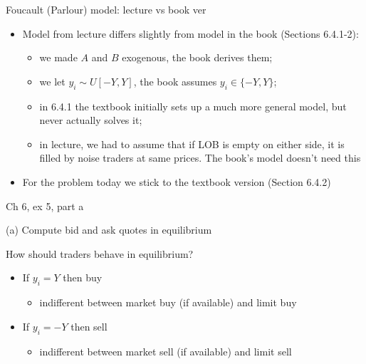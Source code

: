 \documentclass[english,10pt
,aspectratio=169
]{beamer}
\begin{document}
\begin{frame}{Foucault (Parlour) model: lecture vs book ver}
	\begin{itemize}
		\item Model from lecture differs slightly from model \alert{in the book} (Sections 6.4.1-2):
		\begin{itemize}
			\item we made $A$ and $B$ exogenous, the book derives them;
			\item we let $y_i \sim U[-Y,Y]$, the book assumes $y_i \in \{-Y,Y\}$;
			\item in 6.4.1 the textbook initially sets up a much more general model, but never actually solves it;
			\item in lecture, we had to assume that if LOB is empty on either side, it is filled by noise traders at same prices. The book's model doesn't need this
		\end{itemize}
		\item For the problem today we stick to the textbook version (Section 6.4.2)
	\end{itemize}
\end{frame}


\begin{frame}{Ch 6, ex 5, part a}
	\begin{exampleblock}{}
		(a) Compute bid and ask quotes in equilibrium
	\end{exampleblock}
	
	
	\pause
	
	How should traders behave in equilibrium?
	\begin{itemize}
		\item If $y_i = Y$ then buy
		\begin{itemize}
			\item indifferent between market buy (if available) and limit buy
		\end{itemize}
		\item If $y_i = -Y$ then sell
		\begin{itemize}
			\item indifferent between market sell (if available) and limit sell
		\end{itemize}
	\end{itemize}
\end{frame}
\end{document}
